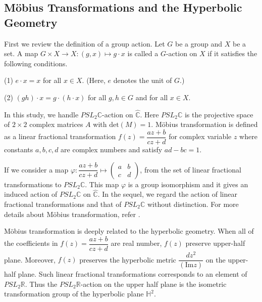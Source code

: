 \subsection{M\"obius Transformations and the Hyperbolic Geometry}

First we review the definition of a group action. 
Let $G$ be a group and $X$ be a set. A map $G \times X \to X : (g,x) \mapsto g\cdot x$
is called a $G$-action on $X$ if it satisfies the following conditions.
\par \qquad (1) $e \cdot x = x$ for all $x \in X$. (Here, $e$ denotes the unit of $G$.)
\par \qquad (2) $(gh) \cdot x = g \cdot (h\cdot x)$ for all $g, h \in G$ and for all $x \in X$.

In this study, we handle $PSL_2\mathbb{C}$-action on $\hat{\mathbb{C}}$.
Here $PSL_2\mathbb{C}$ is the projective space of $2 \times 2$ complex matrices $A$ with $\mathrm{det}(M)=1$.
M\"obius transformation is defined as a linear fractional transformation
$f(z)=\dfrac{az+b}{cz+d}$ for complex variable $z$ where constants
$a, b, c, d$ are complex numbers and satisfy $ad - bc = 1$.

If we consider a map $\varphi: \dfrac{az+b}{cz+d} \mapsto \begin{pmatrix}a & b \\ c& d \end{pmatrix}$,
from the set of linear fractional transformations to $PSL_2\mathbb{C}$.
This map $\varphi$ is a group isomorphism and it gives an induced action of $PSL_2\mathbb{C}$ on $\hat{\mathbb{C}}$.
In the sequel, we regard the action of linear fractional transformations
and that of $PSL_2\mathbb{C}$ without distinction.
For more details about M\"obius transformation, refer
\cite{MumfordSeriesWright200204}\cite{marden_2016}.

M\"obius transformation is deeply related to the hyperbolic geometry.
When all of the coefficients in $f(z) = \dfrac{az + b}{cz + d}$
are real number, $f(z)$ preserve upper-half plane.
Moreover, $f(z)$ preserves the hyperbolic metric $\dfrac{dz^2}{(\mathrm{Im}z)}$
on the upper-half plane.
Such linear fractional transformations corresponds to an element of $PSL_2\mathbb{R}$.
Thus the $PSL_2\mathbb{R}$-action on the upper half plane is
the isometric transformation group of the hyperbolic plane $\mathbb{H}^2$.

